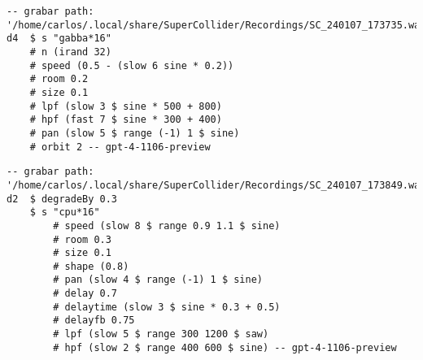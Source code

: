 \begin{minipage}[t]{1\textwidth}
    \centering
    \begin{lstlisting}[style=SuperCollider-IDE, language=ExtendedHaskell, basicstyle=\footnotesize\ttfamily, numbers=none]
-- grabar path: '/home/carlos/.local/share/SuperCollider/Recordings/SC_240107_173735.wav'
d4  $ s "gabba*16" 
    # n (irand 32) 
    # speed (0.5 - (slow 6 sine * 0.2)) 
    # room 0.2 
    # size 0.1 
    # lpf (slow 3 $ sine * 500 + 800) 
    # hpf (fast 7 $ sine * 300 + 400) 
    # pan (slow 5 $ range (-1) 1 $ sine) 
    # orbit 2 -- gpt-4-1106-preview         
    \end{lstlisting}
    \vspace{1cm}
\end{minipage}




\begin{minipage}[t]{1\textwidth}
    \centering
    \begin{lstlisting}[style=SuperCollider-IDE, language=ExtendedHaskell, basicstyle=\footnotesize\ttfamily, numbers=none]
-- grabar path: '/home/carlos/.local/share/SuperCollider/Recordings/SC_240107_173849.wav'
d2  $ degradeBy 0.3 
    $ s "cpu*16" 
        # speed (slow 8 $ range 0.9 1.1 $ sine) 
        # room 0.3 
        # size 0.1 
        # shape (0.8) 
        # pan (slow 4 $ range (-1) 1 $ sine) 
        # delay 0.7 
        # delaytime (slow 3 $ sine * 0.3 + 0.5) 
        # delayfb 0.75 
        # lpf (slow 5 $ range 300 1200 $ saw) 
        # hpf (slow 2 $ range 400 600 $ sine) -- gpt-4-1106-preview      
    \end{lstlisting}
    \vspace{1cm}
\end{minipage}






